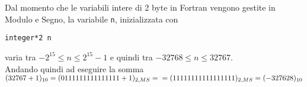 Dal momento che le variabili intere di 2 byte in Fortran vengono gestite in Modulo e Segno, la variabile \texttt{n}, inizializzata con

\begin{lstlisting}
integer*2 n
\end{lstlisting}

varia tra \( - 2^{15} \leq n \leq 2^{15} - 1 \) e quindi tra  \( -32768 \leq n \leq 32767 \). \\
Andando quindi ad eseguire la somma \( (32767+1)_{10} = (0111111111111111 + 1)_{2,MS} = \\
= (11111111111111111)_{2,MS} = (-327628)_{10} \)
